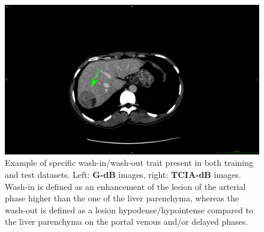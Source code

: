 \documentclass[]{article}
\newcommand{\lmttfont}[1]{{\fontfamily{lmtt}\selectfont #1}}
\begin{document}
\begin{figure}[!ht]
\begin{minipage}{0.45\linewidth}
	\end{minipage} \hspace{-0.1cm}
	\begin{minipage}{0.45\linewidth}
		\includegraphics[width=\linewidth]{../Contributions/images/ImagingTraits/ResizeTCIA_washout}
	\end{minipage}
	\caption{Example of specific wash-in/wash-out trait present in both training and test datasets. Left: \textbf{\lmttfont{G-dB}} images, right: \textbf{\lmttfont{TCIA-dB}} images.
	Wash-in is defined as an enhancement of the lesion of the arterial phase higher than the one of the liver parenchyma, whereas the wash-out is defined as a lesion hypodense/hypointense compared to the liver parenchyma on the portal venous and/or delayed phases.}
	\label{fig:InterDb_imagingTraits3}
\end{figure}
\end{document}
